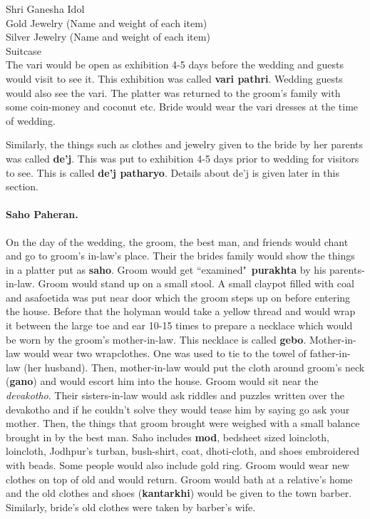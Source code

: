 Shri Ganesha Idol\\
Gold Jewelry (Name and weight of each item)\\
Silver Jewelry (Name and weight of each item)\\
Suitcase\\

The vari would be open as exhibition 4-5 days before the wedding and guests
would visit to see it. This exhibition was called \textbf{vari pathri}. Wedding
guests would also see the vari. The platter was returned to the groom's family
with some coin-money and coconut etc. Bride would wear the vari dresses at the
time of wedding.

Similarly, the things such as clothes and jewelry given to the bride by her
parents was called \textbf{de'j}. This was put to exhibition 4-5 days
prior to wedding for visitors to see. This is called \textbf{de'j patharyo}.
Details about de'j is given later in this section.

\paragraph{Saho Paheran.} On the day of the wedding, the groom, the best man,
and friends would chant and go to groom's in-law's place. Their the brides
family would show the things in a platter put as \textbf{saho}. Groom would
get ``examined"~\textbf{purakhta} by his parents-in-law. Groom would stand
up on a small stool. A small claypot filled with coal and asafoetida was
put near door which the groom steps up on before entering the house. Before
that the holyman would take a yellow thread and would wrap it between the
large toe and ear 10-15 times to prepare a necklace which would be worn by
the groom's mother-in-law. This necklace is called \textbf{gebo}.
Mother-in-law would wear two wrapclothes. One was used to tie to the towel
of father-in-law (her husband). Then, mother-in-law would put the cloth
around groom's neck (\textbf{gano}) and would escort him into the house. Groom
would sit near the \textit{devakotho}. Their sisters-in-law would ask riddles
and puzzles written over the devakotho and if he couldn't solve they would
tease him by saying go ask your mother. Then, the things that groom brought
were weighed with a small balance brought in by the best man. Saho includes
\textbf{mod}, bedsheet sized loincloth, loincloth, Jodhpur's turban,
bush-shirt, coat, dhoti-cloth, and shoes embroidered with beads. Some
people would also include gold ring. Groom would wear new clothes on top of old
and would return. Groom would bath at a relative's home and the old clothes and
shoes (\textbf{kantarkhi}) would be given to the town barber. Similarly,
bride's old clothes were taken by barber's wife.

